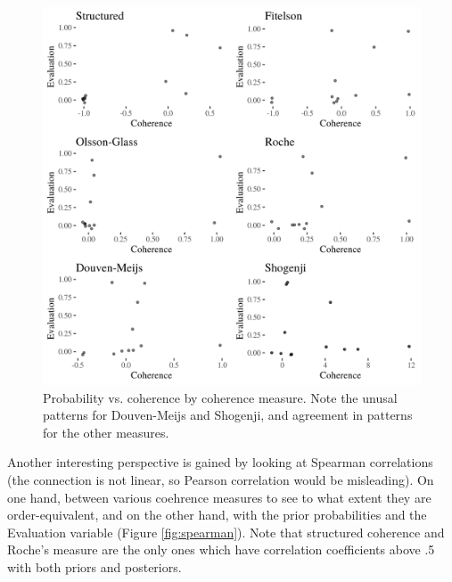 \documentclass[10pt,]{scrartcl}
\begin{document}
\begin{figure}
    \includegraphics{../images/cohPlots.png}
    \caption{Probability vs. coherence by coherence measure. Note the unusal patterns for Douven-Meijs and Shogenji, and agreement in patterns for the other measures.}
    \label{fig:cohplot}
\end{figure}







Another interesting perspective is gained by looking at Spearman correlations (the connection is not linear, so Pearson correlation would be misleading). On one hand, between various coehrence measures to see to what extent they are order-equivalent, and on the other hand, with the prior probabilities and the Evaluation variable (Figure \ref{fig:spearman}).  Note that structured coherence and Roche's measure are the only ones which have correlation coefficients above .5 with both priors and posteriors. 
\end{document}
